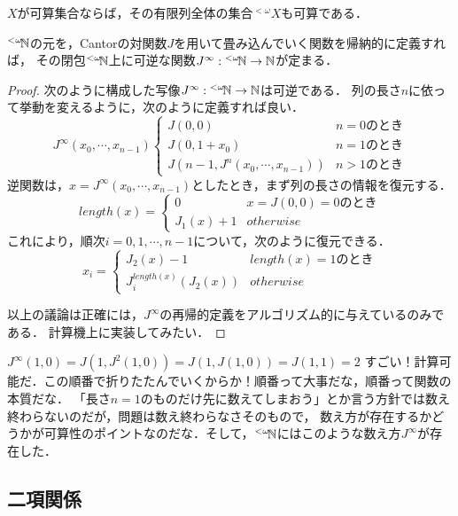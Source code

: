 \documentclass[uplatex, 12pt, dvipdfmx]{jsreport}
\begin{document}
\begin{proposition}\label{prop-cardinality-of-expressions}
    $X$が可算集合ならば，その有限列全体の集合${}^{<\omega}\!X$も可算である．
\end{proposition}
\begin{remark}
    ${}^{<\omega}\!\mathbb{N}$の元を，Cantorの対関数$J$を用いて畳み込んでいく関数を帰納的に定義すれば，
    その閉包${}^{<\omega}\!\mathbb{N}$上に可逆な関数$J^\infty:{}^{<\omega}\!\mathbb{N}\to\mathbb{N}$が定まる．
\end{remark}
\begin{proof}
    次のように構成した写像$J^\infty:{}^{<\omega}\!\mathbb{N}\to\mathbb{N}$は可逆である．
    列の長さ$n$に依って挙動を変えるように，次のように定義すれば良い．
    \[J^\infty(x_0,\cdots,x_{n-1})\begin{cases}
        J(0,0) &n=0のとき\\
        J(0,1+x_0) &n=1のとき\\
        J(n-1,J^n(x_0,\cdots,x_{n-1})) &n>1のとき
    \end{cases}\]
    逆関数は，$x=J^\infty(x_0,\cdots,x_{n-1})$としたとき，まず列の長さの情報を復元する．
    \[length(x)=\begin{cases}
        0 &x=J(0,0)=0のとき\\
        J_1(x)+1 &otherwise
    \end{cases}\]
    これにより，順次$i=0,1,\cdots,n-1$について，次のように復元できる．
    \[x_i=\begin{cases}
        J_2(x)-1 &length(x)=1のとき\\
        J_i^{length(x)}(J_2(x)) &otherwise
    \end{cases}\]
    
    以上の議論は正確には，$J^\infty$の再帰的定義をアルゴリズム的に与えているのみである．
    計算機上に実装してみたい．
\end{proof}

\begin{example}
    $J^\infty(1,0)=J(1,J^2(1,0))=J(1,J(1,0))=J(1,1)=2$
    すごい！計算可能だ．この順番で折りたたんでいくからか！順番って大事だな，順番って関数の本質だな．
    「長さ$n=1$のものだけ先に数えてしまおう」とか言う方針では数え終わらないのだが，問題は数え終わらなさそのもので，
    数え方が存在するかどうかが可算性のポイントなのだな．そして，${}^{<\omega}\!\mathbb{N}$にはこのような数え方$J^\infty$が存在した．
\end{example}

\subsection{二項関係}
\end{document}
